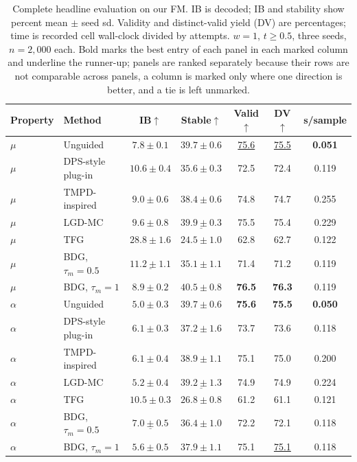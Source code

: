 \documentclass{article}
\begin{document}
\begin{table}[!htbp]
\centering\small
\caption{Complete headline evaluation on our FM. IB is decoded; IB and stability show percent mean $\pm$ seed sd. Validity and distinct-valid yield (DV) are percentages; time is recorded cell wall-clock divided by attempts. $w=1$, $t\ge0.5$, three seeds, $n=2{,}000$ each. Bold marks the best entry of each panel in each marked column and underline the runner-up; panels are ranked separately because their rows are not comparable across panels, a column is marked only where one direction is better, and a tie is left unmarked.}
\label{tab:full-fm}
\begin{tabular}{llccccc}
\toprule
Property & Method & IB$\uparrow$ & Stable$\uparrow$ & Valid$\uparrow$ & DV$\uparrow$ & s/sample\\
\midrule
$\mu$ & Unguided & $7.8\pm0.1$ & $39.7\pm0.6$ & \underline{75.6}& \underline{75.5}& \textbf{0.051}\\
$\mu$ & DPS-style plug-in & $10.6\pm0.4$ & $35.6\pm0.3$ & 72.5 & 72.4 & 0.119\\
$\mu$ & TMPD-inspired & $9.0\pm0.6$ & $38.4\pm0.6$ & 74.8 & 74.7 & 0.255\\
$\mu$ & LGD-MC & $9.6\pm0.8$ & $\underline{39.9\pm0.3}$& 75.5 & 75.4 & 0.229\\
$\mu$ & TFG & $\mathbf{28.8\pm1.6}$& $24.5\pm1.0$ & 62.8 & 62.7 & 0.122\\
$\mu$ & BDG, $\tau_m=0.5$ & $\underline{11.2\pm1.1}$& $35.1\pm1.1$ & 71.4 & 71.2 & 0.119\\
$\mu$ & BDG, $\tau_m=1$ & $8.9\pm0.2$ & $\mathbf{40.5\pm0.8}$& \textbf{76.5}& \textbf{76.3}& 0.119\\
\midrule
$\alpha$ & Unguided & $5.0\pm0.3$ & $\mathbf{39.7\pm0.6}$& \textbf{75.6}& \textbf{75.5}& \textbf{0.050}\\
$\alpha$ & DPS-style plug-in & $6.1\pm0.3$ & $37.2\pm1.6$ & 73.7 & 73.6 & 0.118\\
$\alpha$ & TMPD-inspired & $6.1\pm0.4$ & $38.9\pm1.1$ & 75.1 & 75.0 & 0.200\\
$\alpha$ & LGD-MC & $5.2\pm0.4$ & $\underline{39.2\pm1.3}$& 74.9 & 74.9 & 0.224\\
$\alpha$ & TFG & $\mathbf{10.5\pm0.3}$& $26.8\pm0.8$ & 61.2 & 61.1 & 0.121\\
$\alpha$ & BDG, $\tau_m=0.5$ & $\underline{7.0\pm0.5}$& $36.4\pm1.0$ & 72.2 & 72.1 & 0.118\\
$\alpha$ & BDG, $\tau_m=1$ & $5.6\pm0.5$ & $37.9\pm1.1$ & 75.1 & \underline{75.1}& 0.118\\

\end{tabular}
\end{table}
\end{document}
